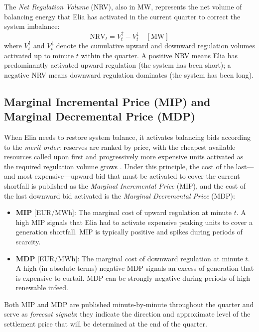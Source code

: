 The \textit{Net Regulation Volume} (NRV), also in MW, represents the net volume of balancing energy that Elia has activated in the current quarter to correct the system imbalance:
\[
    \text{NRV}_t = V^{\uparrow}_t - V^{\downarrow}_t \quad [\text{MW}]
\]
where $V^{\uparrow}_t$ and $V^{\downarrow}_t$ denote the cumulative upward and downward regulation volumes activated up to minute $t$ within the quarter. A positive NRV means Elia has predominantly activated upward regulation (the system has been short); a negative NRV means downward regulation dominates (the system has been long).

\subsection{Marginal Incremental Price (MIP) and Marginal Decremental Price (MDP)}

When Elia needs to restore system balance, it activates balancing bids according to the \textit{merit order}: reserves are ranked by price, with the cheapest available resources called upon first and progressively more expensive units activated as the required regulation volume grows \cite{[search: merit order electricity balancing reserves activation TSO price formation]}. Under this principle, the cost of the last—and most expensive—upward bid that must be activated to cover the current shortfall is published as the \textit{Marginal Incremental Price} (MIP), and the cost of the last downward bid activated is the \textit{Marginal Decremental Price} (MDP):

\begin{itemize}
    \item \textbf{MIP} [EUR/MWh]: The marginal cost of upward regulation at minute $t$. A high MIP signals that Elia had to activate expensive peaking units to cover a generation shortfall. MIP is typically positive and spikes during periods of scarcity.
    \item \textbf{MDP} [EUR/MWh]: The marginal cost of downward regulation at minute $t$. A high (in absolute terms) negative MDP signals an excess of generation that is expensive to curtail. MDP can be strongly negative during periods of high renewable infeed.
\end{itemize}

Both MIP and MDP are published minute-by-minute throughout the quarter and serve as \textit{forecast signals}: they indicate the direction and approximate level of the settlement price that will be determined at the end of the quarter.

